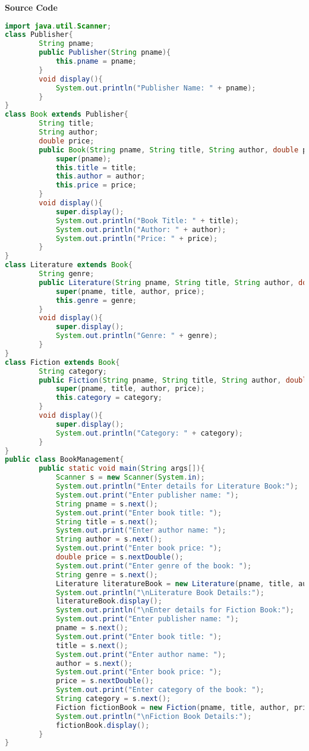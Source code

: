\vspace{0.5cm}
\textbf{Source Code}
\begin{lstlisting}[language=Java]
import java.util.Scanner;
class Publisher{
    	String pname;
    	public Publisher(String pname){
        	this.pname = pname;
    	}
    	void display(){
        	System.out.println("Publisher Name: " + pname);
    	}
}
class Book extends Publisher{
    	String title;
    	String author;
    	double price;
    	public Book(String pname, String title, String author, double price) {
        	super(pname);
        	this.title = title;
        	this.author = author;
        	this.price = price;
    	}
    	void display(){
        	super.display();
        	System.out.println("Book Title: " + title);
        	System.out.println("Author: " + author);
        	System.out.println("Price: " + price);
    	}
}
class Literature extends Book{
    	String genre;
    	public Literature(String pname, String title, String author, double price, String genre){
        	super(pname, title, author, price);
        	this.genre = genre;
    	}
    	void display(){
        	super.display();
        	System.out.println("Genre: " + genre);
    	}
}
class Fiction extends Book{
    	String category;
    	public Fiction(String pname, String title, String author, double price, String category){
        	super(pname, title, author, price);
        	this.category = category;
    	}
    	void display(){
        	super.display();
        	System.out.println("Category: " + category);
    	}
}
public class BookManagement{
    	public static void main(String args[]){
        	Scanner s = new Scanner(System.in);
        	System.out.println("Enter details for Literature Book:");
        	System.out.print("Enter publisher name: ");
        	String pname = s.next();
        	System.out.print("Enter book title: ");
        	String title = s.next();
        	System.out.print("Enter author name: ");
        	String author = s.next();
        	System.out.print("Enter book price: ");
        	double price = s.nextDouble();
        	System.out.print("Enter genre of the book: ");
        	String genre = s.next();
        	Literature literatureBook = new Literature(pname, title, author, price, genre);
        	System.out.println("\nLiterature Book Details:");
        	literatureBook.display();
        	System.out.println("\nEnter details for Fiction Book:");
        	System.out.print("Enter publisher name: ");
        	pname = s.next();
        	System.out.print("Enter book title: ");
        	title = s.next();
        	System.out.print("Enter author name: ");
        	author = s.next();
        	System.out.print("Enter book price: ");
        	price = s.nextDouble();
        	System.out.print("Enter category of the book: ");
        	String category = s.next();
        	Fiction fictionBook = new Fiction(pname, title, author, price, category);
        	System.out.println("\nFiction Book Details:");
        	fictionBook.display();
    	}
}
\end{lstlisting}

